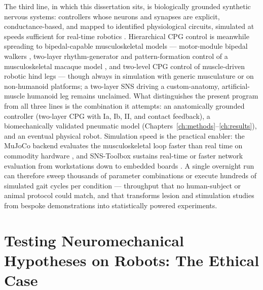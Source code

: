 The third line, in which this dissertation sits, is biologically grounded synthetic nervous systems: controllers whose neurons and synapses are explicit, conductance-based, and mapped to identified physiological circuits, simulated at speeds sufficient for real-time robotics \citep{nourse_sns_2023}. Hierarchical CPG control is meanwhile spreading to bipedal-capable musculoskeletal models --- motor-module bipedal walkers \citep{ichimura_pathological_2019}, two-layer rhythm-generator and pattern-formation control of a musculoskeletal macaque model \citep{nishizaki_gait_2026}, and two-level CPG control of muscle-driven robotic hind legs \citep{fukuoka_autonomous_2021} --- though always in simulation with generic musculature or on non-humanoid platforms; a two-layer SNS driving a custom-anatomy, artificial-muscle humanoid leg remains unclaimed. What distinguishes the present program from all three lines is the combination it attempts: an anatomically grounded controller (two-layer CPG with Ia, Ib, II, and contact feedback), a biomechanically validated pneumatic model (Chapters~\ref{ch:methods}--\ref{ch:results}), and an eventual physical robot. Simulation speed is the practical enabler: the MuJoCo backend evaluates the musculoskeletal loop faster than real time on commodity hardware \citep{todorov_mujoco_2012, caggiano_myosuite_2022}, and SNS-Toolbox sustains real-time or faster network evaluation from workstations down to embedded boards \citep{nourse_sns_2023}. A single overnight run can therefore sweep thousands of parameter combinations or execute hundreds of simulated gait cycles per condition --- throughput that no human-subject or animal protocol could match, and that transforms lesion and stimulation studies from bespoke demonstrations into statistically powered experiments.

\section{Testing Neuromechanical Hypotheses on Robots: The Ethical Case}\label{sec:bg_ethics}

